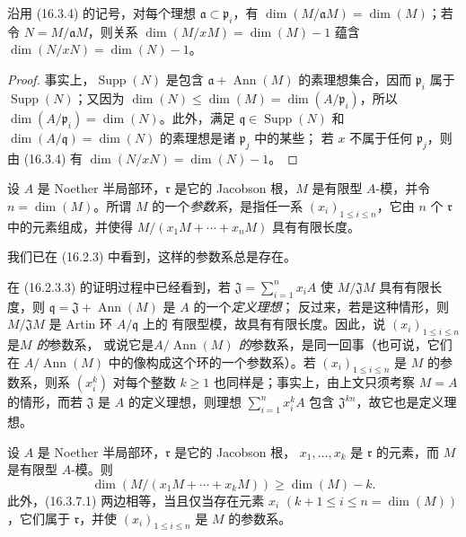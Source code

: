 \begin{corollary}[16.3.5]
\label{0.16.3.5-fr}
沿用 (16.3.4) 的记号，对每个理想 $\mathfrak{a}\subset\mathfrak{p}_i$，有
$\dim(M/\mathfrak{a}M)=\dim(M)$；若令 $N=M/\mathfrak{a}M$，则关系
$\dim(M/xM)=\dim(M)-1$ 蕴含
$\dim(N/xN)=\dim(N)-1$。
\end{corollary}

\begin{proof}
事实上，$\operatorname{Supp}(N)$ 是包含 $\mathfrak{a}+\operatorname{Ann}(M)$
的素理想集合，因而 $\mathfrak{p}_i$ 属于 $\operatorname{Supp}(N)$；又因为
$\dim(N)\leq\dim(M)=\dim(A/\mathfrak{p}_i)$，所以
$\dim(A/\mathfrak{p}_i)=\dim(N)$。此外，满足
$\mathfrak{q}\in\operatorname{Supp}(N)$ 和
$\dim(A/\mathfrak{q})=\dim(N)$ 的素理想是诸 $\mathfrak{p}_j$ 中的某些；
若 $x$ 不属于任何 $\mathfrak{p}_j$，则由 (16.3.4) 有
$\dim(N/xN)=\dim(N)-1$。
\end{proof}

\begin{definition}[16.3.6]
\label{0.16.3.6-fr}
设 $A$ 是 Noether 半局部环，$\mathfrak{r}$ 是它的 Jacobson 根，$M$ 是有限型
$A$-模，并令 $n=\dim(M)$。所谓 $M$ 的一个\emph{参数系}，是指任一系
$(x_i)_{1\leq i\leq n}$，它由 $n$ 个 $\mathfrak{r}$ 中的元素组成，并使得
$M/(x_1M+\cdots+x_nM)$ 具有有限长度。
\end{definition}

我们已在 (16.2.3) 中看到，这样的参数系总是存在。

在 (16.2.3.3) 的证明过程中已经看到，若
$\mathfrak{J}=\sum_{i=1}^n x_iA$ 使 $M/\mathfrak{J}M$ 具有有限长度，则
$\mathfrak{q}=\mathfrak{J}+\operatorname{Ann}(M)$ 是 $A$ 的一个\emph{定义理想}；
反过来，若是这种情形，则 $M/\mathfrak{J}M$ 是 Artin 环 $A/\mathfrak{q}$ 上的
有限型模，故具有有限长度。因此，说 $(x_i)_{1\leq i\leq n}$ 是\emph{$M$ 的}参数系，
或说它是\emph{$A/\operatorname{Ann}(M)$ 的}参数系，是同一回事（也可说，它们在
$A/\operatorname{Ann}(M)$ 中的像构成这个环的一个参数系）。若
$(x_i)_{1\leq i\leq n}$ 是 $M$ 的参数系，则系 $(x_i^k)$ 对每个整数
$k\geq1$ 也同样是；事实上，由上文只须考察 $M=A$ 的情形，而若
$\mathfrak{J}$ 是 $A$ 的定义理想，则理想 $\sum_{i=1}^n x_i^kA$ 包含
$\mathfrak{J}^{kn}$，故它也是定义理想。

\begin{proposition}[16.3.7]
\label{0.16.3.7-fr}
设 $A$ 是 Noether 半局部环，$\mathfrak{r}$ 是它的 Jacobson 根，
$x_1,\ldots,x_k$ 是 $\mathfrak{r}$ 的元素，而 $M$ 是有限型 $A$-模。则
\begin{equation}
\label{0.16.3.7.1-fr}
\tag{16.3.7.1}
  \dim(M/(x_1M+\cdots+x_kM))\geq\dim(M)-k.
\end{equation}
此外，(16.3.7.1) 两边相等，当且仅当存在元素 $x_i$
$(k+1\leq i\leq n=\dim(M))$，它们属于 $\mathfrak{r}$，并使
$(x_i)_{1\leq i\leq n}$ 是 $M$ 的参数系。
\end{proposition}

